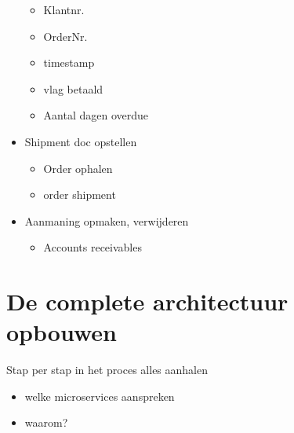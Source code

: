 \begin{itemize}
		\begin{itemize}
			\item Klantnr.
			\item OrderNr.
			\item timestamp
			\item vlag betaald
			\item Aantal dagen overdue
		\end{itemize}
	\item Shipment doc opstellen
		\begin{itemize}
			\item Order ophalen
			\item order shipment
		\end{itemize}
	\item Aanmaning opmaken, verwijderen
		\begin{itemize}
			\item Accounts receivables
		\end{itemize}
\end{itemize}


\section{De complete architectuur opbouwen}
Stap per stap in het proces alles aanhalen
\begin{itemize}
	\item welke microservices aanspreken
	\item waarom?
\end{itemize}




